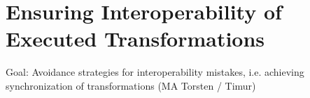 




\section{Ensuring Interoperability of Executed Transformations }
Goal: Avoidance strategies for interoperability mistakes, i.e. achieving synchronization of transformations (MA Torsten / Timur)
\label{chap:prevention:interoperability}

